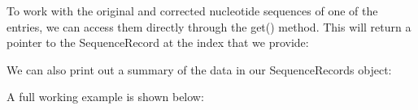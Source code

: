 \documentclass[letterpaper,10pt,english]{sphinxmanual}
\begin{document}
\begin{sphinxVerbatim}[commandchars=\\\{\}]
     
\end{sphinxVerbatim}

To work with the original and corrected nucleotide sequences of one of the entries, we can access them directly through the get() method. This will return a pointer to the SequenceRecord at the index that we provide:

\begin{sphinxVerbatim}[commandchars=\\\{\}]
        
        
\end{sphinxVerbatim}

We can also print out a summary of the data in our SequenceRecords object:

\begin{sphinxVerbatim}[commandchars=\\\{\}]
\end{sphinxVerbatim}

A full working example is shown below:
\end{document}
